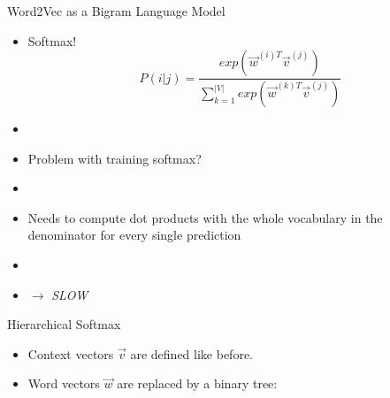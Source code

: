 
\begin{frame}{Word2Vec as a Bigram Language Model}

\vfill

\begin{itemize}
	\item Softmax!
	$$P(i|j) = \frac{exp(\vec w^{(i)T} \vec v^{(j)})}{\sum_{k=1}^{|V|} exp(\vec w^{(k)T} \vec v^{(j)})}$$
	\item[]
	\item \ques Problem with training softmax?
	\pause
	\item[]
	\item[] Needs to compute dot products with the whole vocabulary in the denominator for every single prediction
	\item[]
	\item[] \centering $\rightarrow$ \textit{SLOW}
\end{itemize}

\vfill

\end{frame}


\iffalse

\begin{vbframe}{Hierarchical Softmax}

\vfill

\begin{itemize}
	\item Context vectors $\vec v$ are defined like before.
	\item Word vectors $\vec w$ are replaced by a binary tree:
\end{itemize}

\begin{center}
\end{center}

\vfill

\end{vbframe}

